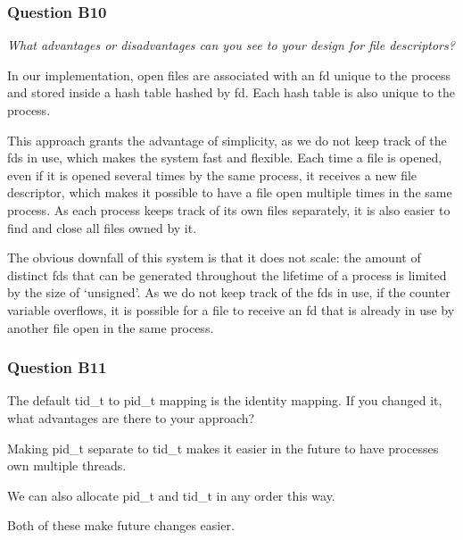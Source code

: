 \subsubsection*{Question B10} %
\textit{What advantages or disadvantages can you see to your design for file descriptors?}

In our implementation, open files are associated with an fd unique to the process and stored inside a hash table hashed by fd. Each hash table is also unique to the process.

This approach grants the advantage of simplicity, as we do not keep track of the fds in use, which makes the system fast and flexible.
Each time a file is opened, even if it is opened several times by the same process, it receives a new file descriptor, which makes it possible to have a file open multiple times in the same process.
As each process keeps track of its own files separately, it is also easier to find and close all files owned by it.

The obvious downfall of this system is that it does not scale: the amount of distinct fds that can be generated throughout the lifetime of a process is limited by the size of `unsigned'. As we do not keep track of the fds in use, if the counter variable overflows, it is possible for a file to receive an fd that is already in use by another file open in the same process.


\subsubsection*{Question B11} %
The default tid\_t to pid\_t mapping is the identity mapping. If you changed it, what advantages are there to your approach?

Making pid\_t separate to tid\_t makes it easier in the future to have processes own multiple threads.

We can also allocate pid\_t and tid\_t in any order this way.

Both of these make future changes easier.
